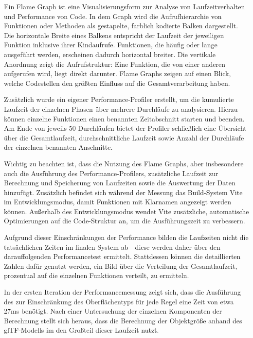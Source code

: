 Ein Flame Graph ist eine Visualisierungsform zur Analyse von Laufzeitverhalten und Performance von Code. In dem Graph wird die Aufrufhierarchie von Funktionen oder Methoden als gestapelte, farblich kodierte Balken dargestellt. Die horizontale Breite eines Balkens entspricht der Laufzeit der jeweiligen Funktion inklusive ihrer Kindaufrufe. Funktionen, die häufig oder lange ausgeführt werden, erscheinen dadurch horizontal breiter. Die vertikale Anordnung zeigt die Aufrufstruktur: Eine Funktion, die von einer anderen aufgerufen wird, liegt direkt darunter. Flame Graphs zeigen auf einen Blick, welche Codestellen den größten Einfluss auf die Gesamtverarbeitung haben.

Zusätzlich wurde ein eigener Performance-Profiler  erstellt, um die kumulierte Laufzeit der einzelnen Phasen über mehrere Durchläufe zu analysieren. Hierzu können einzelne Funktionen einen benannten Zeitabschnitt starten und beenden. Am Ende von jeweils 50 Durchläufen bietet der Profiler schließlich eine Übersicht über die Gesamtlaufzeit, durchschnittliche Laufzeit sowie Anzahl der Durchläufe der einzelnen benannten Anschnitte.

Wichtig zu beachten ist, dass die Nutzung des Flame Graphs, aber insbesondere auch die Ausführung des Performance-Profilers, zusätzliche Laufzeit zur Berechnung und Speicherung von Laufzeiten sowie die Auswertung der Daten hinzufügt. Zusätzlich befindet sich während der Messung das Build-System Vite im Entwicklungsmodus, damit Funktionen mit Klarnamen angezeigt werden können. Außerhalb des Entwicklungsmodus wendet Vite zusätzliche, automatische Optimierungen auf die Code-Struktur an, um die Ausführungszeit zu verbessern.

Aufgrund dieser Einschränkungen der Performance bilden die Laufzeiten nicht die tatsächlichen Zeiten im finalen System ab - diese werden daher über den darauffolgenden Performancetest ermittelt. Stattdessen können die detaillierten Zahlen dafür genutzt werden, ein Bild über die Verteilung der Gesamtlaufzeit, prozentual auf die einzelnen Funktionen verteilt, zu ermitteln.

\medskip

In der ersten Iteration der Performancemessung zeigt sich, dass die Ausführung des  zur Einschränkung des Oberflächentyps für jede Regel eine Zeit von etwa 27ms benötigt. Nach einer Untersuchung der einzelnen Komponenten der Berechnung stellt sich heraus, dass die Berechnung der Objektgröße anhand des glTF-Modells im  den Großteil dieser Laufzeit nutzt.

